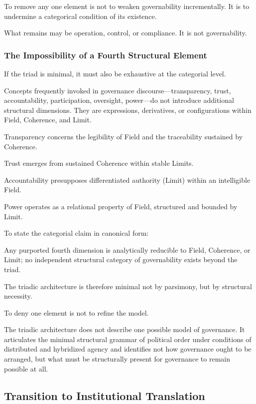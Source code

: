 \documentclass[12pt]{article}
\begin{document}
To remove any one element is not to weaken governability incrementally. It is to undermine a categorical condition of its existence.

What remains may be operation, control, or compliance. It is not governability.

\subsubsection{The Impossibility of a Fourth Structural Element}


If the triad is minimal, it must also be exhaustive at the categorial level.

Concepts frequently invoked in governance discourse—transparency, trust, accountability, participation, oversight, power—do not introduce additional structural dimensions. They are expressions, derivatives, or configurations within Field, Coherence, and Limit.

Transparency concerns the legibility of Field and the traceability sustained by Coherence.

Trust emerges from sustained Coherence within stable Limits.

Accountability presupposes differentiated authority (Limit) within an intelligible Field.

Power operates as a relational property of Field, structured and bounded by Limit.

To state the categorial claim in canonical form:

Any purported fourth dimension is analytically reducible to Field, Coherence, or Limit; no independent structural category of governability exists beyond the triad.

The triadic architecture is therefore minimal not by parsimony, but by structural necessity.

To deny one element is not to refine the model.

The triadic architecture does not describe one possible model of governance. It articulates the minimal structural grammar of political order under conditions of distributed and hybridized agency and identifies not how governance ought to be arranged, but what must be structurally present for governance to remain possible at all.

\subsection{Transition to Institutional Translation}
\end{document}
